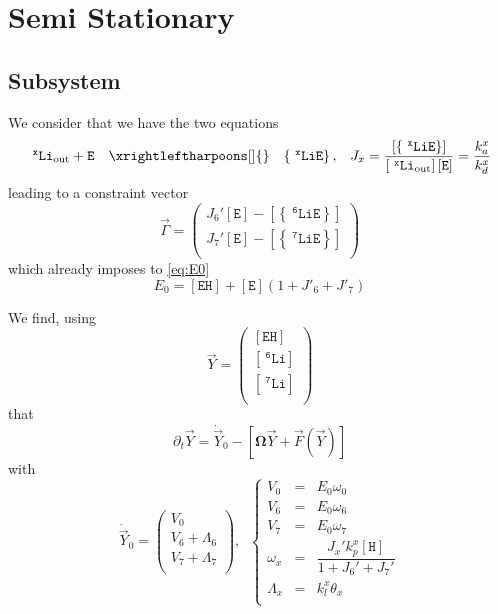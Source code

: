 \documentclass[aps,onecolumn,11pt]{revtex4}
\newcommand{\mychem}[1]{\mathtt{#1}}
\newcommand{\myconc}[1]{\left\lbrack{#1}\right\rbrack}
\newcommand{\spLi}[1]{{~^{\mychem{#1}}\mychem{Li}}}
\newcommand{\Li}[1]{\myconc{\spLi{#1}}}
\newcommand{\spEout}{\mychem{E}}
\newcommand{\Eout}{\myconc{\spEout}}
\newcommand{\spLiE}[1]{\left\lbrace\spLi{#1}\spEout\right\rbrace}
\newcommand{\LiE}[1]{\myconc{\spLiE{#1}}}
\newcommand{\spLiOut}[1]{{\spLi{#1}}_{\mathrm{out}}}
\newcommand{\LiOut}[1]{\myconc{\spLiOut{#1}}}
\newcommand{\spEHin}{\mychem{EH}}
\newcommand{\EHin}{\myconc{\spEHin}}
\newcommand{\spproton}{\mychem{H}}
\newcommand{\proton}{\myconc{\spproton}}
\newcommand{\mymat}[1]{{\bm{#1}}}
\begin{document}
\section{Semi Stationary}
\subsection{Subsystem}
We consider that we have the two equations
\begin{equation}
	\begin{array}{rcll}
	 \spLiOut{x} +  \spEout &  \xrightleftharpoons[]{} & \spLiE{x}, & J_x = \dfrac{\LiE{x}}{\LiOut{x} \Eout} = \dfrac{k_a^x}{k_d^x}\\
	 \end{array}
\end{equation}
leading to a constraint vector
\begin{equation}
\vec{\Gamma} = 
\begin{pmatrix}
	J_6' \Eout - \LiE{6} \\
	J_7' \Eout - \LiE{7} \\
\end{pmatrix}
\end{equation}
which already imposes to \eqref{eq:E0}
\begin{equation}
	E_0 = \EHin + \Eout \left(1+J'_6+J'_7\right)
\end{equation}

We find, using
\begin{equation}
	\vec{Y} = \begin{pmatrix}
	\EHin\\
	\Li{6}\\
	\Li{7}\\
	\end{pmatrix}
\end{equation}
that
\begin{equation}
	\partial_t \vec{Y} = \dot{\vec{Y}}_0 - \left\lbrack \mymat{\Omega}\vec{Y} + \vec{F}\left(\vec{Y}\right)\right\rbrack
\end{equation}
with
\begin{equation}
	\dot{\vec{Y}}_0 = 
	\begin{pmatrix}
	V_0\\
	V_6+\Lambda_6\\
	V_7+\Lambda_7\\
	\end{pmatrix},
	\;\;
	\left\lbrace
	\begin{array}{rcl}
	V_0 & = &E_0 \omega_0\\
	V_6 & = &E_0 \omega_6\\
	V_7 & = &E_0 \omega_7\\
	\omega_x & = & \dfrac{J_x' k_p^x \proton}{1+J_6'+J_7'}\\
	\Lambda_x & = & k_l^x \theta_x \\
	\end{array}
	\right.
\end{equation}
\end{document}

